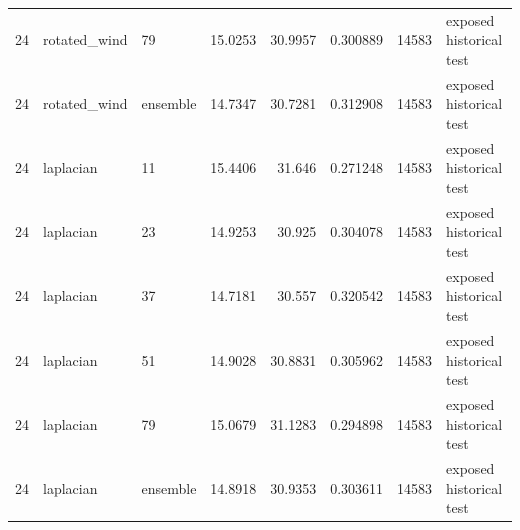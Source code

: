\begin{tabular}{rllrrrrl}
24 & rotated\_wind & 79 & 15.0253 & 30.9957 & 0.300889 & 14583 & exposed historical test \\
24 & rotated\_wind & ensemble & 14.7347 & 30.7281 & 0.312908 & 14583 & exposed historical test \\
24 & laplacian & 11 & 15.4406 & 31.646 & 0.271248 & 14583 & exposed historical test \\
24 & laplacian & 23 & 14.9253 & 30.925 & 0.304078 & 14583 & exposed historical test \\
24 & laplacian & 37 & 14.7181 & 30.557 & 0.320542 & 14583 & exposed historical test \\
24 & laplacian & 51 & 14.9028 & 30.8831 & 0.305962 & 14583 & exposed historical test \\
24 & laplacian & 79 & 15.0679 & 31.1283 & 0.294898 & 14583 & exposed historical test \\
24 & laplacian & ensemble & 14.8918 & 30.9353 & 0.303611 & 14583 & exposed historical test \\
\hline
\end{tabular}
